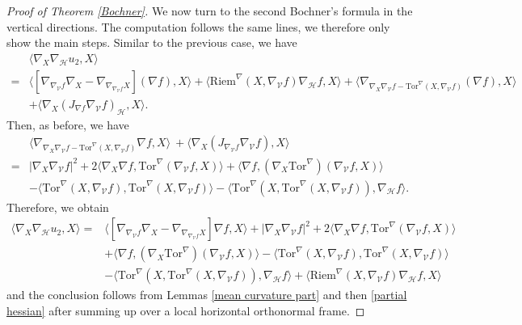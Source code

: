 \documentclass[10pt,a4paper]{amsart}
\newcommand{\Ho}{\mathcal H}
\newcommand{\Tor}{\mathrm{Tor}}
\newcommand{\V}{\mathcal V}
\begin{document}
\begin{proof}[Proof of Theorem \ref{Bochner}]
        
        We now turn to the second Bochner's formula in the vertical directions. The computation follows the same lines, we therefore only show the main steps.  Similar to the previous case, we have
		\begin{align*}
			&\langle \nabla_X \nabla_{\mathcal{H}}u_2 ,X \rangle\\
			=&\langle[\nabla_{\nabla_\mathcal{V}f} \nabla_X-\nabla_{\nabla_{\nabla_\mathcal{V}f} X}] (\nabla f), X \rangle+\langle\mathrm{Riem}^{\nabla}(X, \nabla_{\mathcal{V}} f) \nabla_\Ho f, X\rangle+\langle \nabla_{\nabla_X \nabla_\mathcal{V}f-\Tor^{\nabla}(X, \nabla_\mathcal{V}f) } (\nabla f), X \rangle\\
			&+\langle \nabla_X (J_{\nabla f}\nabla_\mathcal{V}f)_{\mathcal{H}}, X \rangle.
		\end{align*} 
		Then, as before, we have
		\begin{align*}
			& \langle \nabla_{\nabla_X \nabla_\mathcal{V}f-\Tor^{\nabla}(X, \nabla_\mathcal{V}f) } \nabla f, X \rangle\
			+\langle \nabla_X (J_{\nabla_\V f}\nabla_\mathcal{V}f), X \rangle \\
			=&|\nabla_X \nabla_\mathcal{V}f  |^2+2\langle \nabla_X \nabla f, \Tor^\nabla(\nabla_{\mathcal{V}}f, X) \rangle+\langle \nabla f, (\nabla_X \Tor^\nabla)(\nabla_{\mathcal{V}}f, X) \rangle \\
			&-\langle \Tor^{\nabla}(X, \nabla_\mathcal{V}f) ,\Tor^{\nabla}(X, \nabla_\mathcal{V}f)\rangle-\langle \Tor^\nabla(X, \Tor^{\nabla}(X, \nabla_\mathcal{V}f) ), \nabla_\Ho f \rangle.
		\end{align*}
		Therefore, we obtain
		\begin{align*}
			\langle \nabla_X \nabla_{\mathcal{H}}u_2 ,X \rangle=&\langle[\nabla_{\nabla_\mathcal{V}f} \nabla_X-\nabla_{\nabla_{\nabla_\mathcal{V}f} X}] \nabla f, X \rangle +|\nabla_X \nabla_\mathcal{V}f  |^2+2\langle \nabla_X \nabla f, \Tor^\nabla(\nabla_{\mathcal{V}}f, X) \rangle \\
			&+\langle \nabla f, (\nabla_X \Tor^\nabla)(\nabla_{\mathcal{V}}f, X) \rangle  -\langle \Tor^{\nabla}(X, \nabla_\mathcal{V}f) ,\Tor^{\nabla}(X, \nabla_\mathcal{V}f)\rangle \\
             &-\langle \Tor^\nabla(X, \Tor^{\nabla}(X, \nabla_\mathcal{V}f) ), \nabla_\Ho f \rangle+\langle\mathrm{Riem}^{\nabla}(X, \nabla_{\mathcal{V}} f) \nabla_\Ho f, X\rangle
		\end{align*}
		and the conclusion follows from Lemmas \ref{mean curvature part} and then  \ref{partial hessian} after summing up over a local horizontal orthonormal frame.
	\end{proof}
\end{document}
